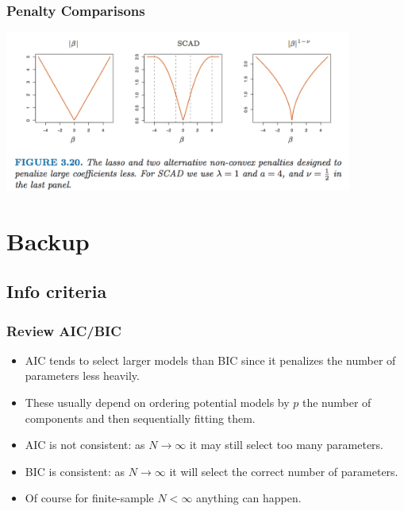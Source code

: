 \begin{frame}
\frametitle{Penalty Comparisons}
\begin{center}
\includegraphics[width=4.5in]{./resources/lassopenalty}
\end{center}
\end{frame}



\begin{frame}[allowframebreaks]
    
    
\end{frame}

\section*{Backup}
\subsection*{Info criteria}\label{sec:info}

\begin{frame}
    \frametitle{Review AIC/BIC}
    \begin{itemize}
    \item AIC tends to select larger models than BIC since it penalizes the number of parameters less heavily.
    \item These usually depend on ordering potential models by $p$ the number of components and then sequentially fitting them.
    \item AIC is not consistent: as $N \rightarrow \infty$ it may still select too many parameters.
    \item BIC is consistent: as $N \rightarrow \infty$ it will select the correct number of parameters.
    \item Of course for finite-sample $N < \infty$ anything can happen.
    \end{itemize}
\end{frame}
    
